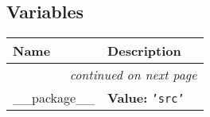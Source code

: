 
  \subsection{Variables}

    \vspace{-1cm}
\hspace{\varindent}\begin{longtable}{|p{\varnamewidth}|p{\vardescrwidth}|l}
\cline{1-2}
\cline{1-2} \centering \textbf{Name} & \centering \textbf{Description}& \\
\cline{1-2}
\endhead\cline{1-2}\multicolumn{3}{r}{\small\textit{continued on next page}}\\\endfoot\cline{1-2}
\endlastfoot\raggedright \_\-\_\-p\-a\-c\-k\-a\-g\-e\-\_\-\_\- & \raggedright \textbf{Value:} 
{\tt \texttt{'}\texttt{src}\texttt{'}}&\\
\cline{1-2}
\end{longtable}

